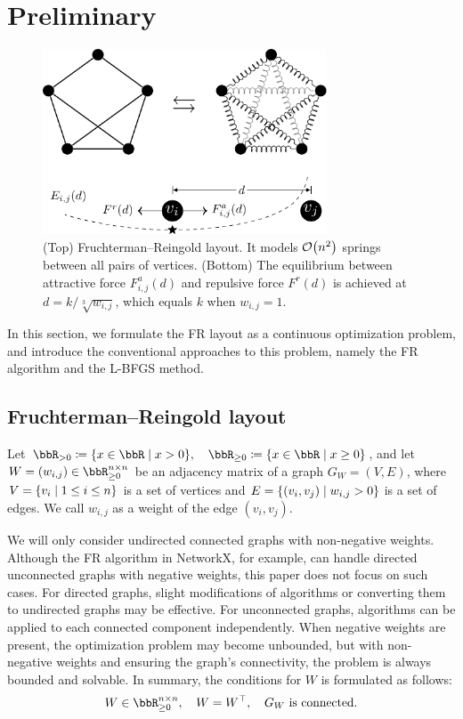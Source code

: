 \documentclass[dvipdfmx,lettersize,journal]{IEEEtran}
\newcommand{\defeq}{\coloneqq}
\begin{document}
\section{Preliminary}\label{sec:preliminary}

\begin{figure}[t]
  \centering
  \includegraphics[height=5.5cm]{fr_layout.pdf}
  \caption{
    (Top) Fruchterman--Reingold layout. It models $\order{n^2}$ springs between all pairs of vertices.
    (Bottom) The equilibrium between attractive force $F_{i,j}^a(d)$ and repulsive force $F^r(d)$ is achieved at $d = k/\sqrt[3]{w_{i,j}}$, which equals $k$ when $w_{i,j} = 1$.
  }
  \label{fig:frLayout}
\end{figure}

In this section, we formulate the FR layout as a continuous optimization problem, and introduce the conventional approaches to this problem, namely the FR algorithm and the L-BFGS method.

\subsection{Fruchterman--Reingold layout}\label{ssec:frLayout}

Let $\bbR_{> 0} \defeq \qty{ x \in \bbR \mid x > 0 }, \quad \bbR_{\geq 0} \defeq \qty{ x \in \bbR \mid x \geq 0 }$, and let $W = (w_{i,j}) \in \bbR_{\geq 0}^{n \times n}$ be an adjacency matrix of a graph $G_W = (V, E)$, where $V = \qty{v_i \mid 1 \leq i \leq n}$ is a set of vertices and $E = \qty{(v_i, v_j) \mid w_{i,j} > 0}$ is a set of edges. We call $w_{i,j}$ as a weight of the edge $(v_i, v_j)$.

We will only consider undirected connected graphs with non-negative weights.
Although the FR algorithm in NetworkX, for example, can handle directed unconnected graphs with negative weights, this paper does not focus on such cases.
For directed graphs, slight modifications of algorithms or converting them to undirected graphs may be effective.
For unconnected graphs, algorithms can be applied to each connected component independently.
When negative weights are present, the optimization problem may become unbounded, but with non-negative weights and ensuring the graph's connectivity, the problem is always bounded and solvable.
In summary, the conditions for $W$ is formulated as follows:
\begin{equation}\label{eq:WCondition}
  W \in \bbR_{\geq 0}^{n \times n}, \quad W = W^\top, \quad \text{$G_W$ is connected}.
\end{equation}
\end{document}
